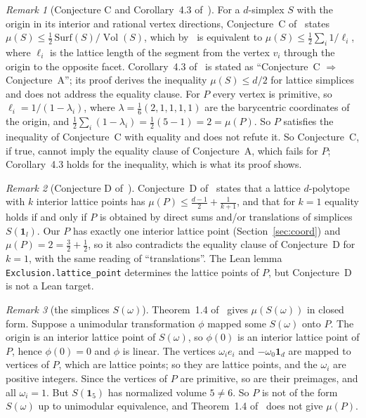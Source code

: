 \documentclass[11pt]{article}
\theoremstyle{definition}
\theoremstyle{remark}
\newtheorem{remark}{Remark}
\newcommand{\one}{\mathbf 1}
\newcommand{\Vol}{\operatorname{Vol}}
\begin{document}
\begin{remark}[Conjecture C and Corollary~4.3 of~\cite{css}]\label{rem:C}
For a $d$-simplex $S$ with the origin in its interior and rational vertex
directions, Conjecture~C of~\cite{css} states $\mu(S)\le\frac12\,\mathrm{Surf}(S)/\Vol(S)$,
which by~\cite[Lemma~4.1]{css} is equivalent to
$\mu(S)\le\frac12\sum_i1/\ell_i$, where $\ell_i$ is the lattice length of the
segment from the vertex $v_i$ through the origin to the opposite facet.
Corollary~4.3 of~\cite{css} is stated as ``Conjecture~C $\Rightarrow$
Conjecture~A''; its proof derives the inequality $\mu(S)\le d/2$ for lattice
simplices and does not address the equality clause. For $P$ every vertex is
primitive, so $\ell_i=1/(1-\lambda_i)$, where $\lambda=\frac16(2,1,1,1,1)$ are
the barycentric coordinates of the origin, and
$\frac12\sum_i(1-\lambda_i)=\frac12(5-1)=2=\mu(P)$. So $P$ satisfies the
inequality of Conjecture~C with equality and does not refute it. So Conjecture~C,
if true, cannot imply the equality clause of Conjecture~A, which fails for
$P$; Corollary~4.3 holds for the inequality, which is what its proof
shows.
\end{remark}

\begin{remark}[Conjecture D of~\cite{css}]\label{rem:D}
Conjecture~D of~\cite{css} states that a lattice $d$-polytope with $k$
interior lattice points has $\mu(P)\le\frac{d-1}2+\frac1{k+1}$, and that for
$k=1$ equality holds if and only if $P$ is obtained by direct sums and/or
translations of simplices $S(\one_l)$. Our $P$ has exactly one interior
lattice point (Section~\ref{sec:coord}) and $\mu(P)=2=\frac32+\frac12$, so it
also contradicts the equality clause of Conjecture~D for $k=1$, with the same
reading of ``translations''. The Lean lemma \texttt{Exclusion.lattice\_point}
determines the lattice points of $P$, but Conjecture~D is not a Lean target.
\end{remark}

\begin{remark}[the simplices $S(\omega)$]\label{rem:somega}
Theorem~1.4 of~\cite{css} gives $\mu(S(\omega))$ in closed form. Suppose a
unimodular transformation $\phi$ mapped some $S(\omega)$ onto $P$. The origin is
an interior lattice point of $S(\omega)$, so $\phi(0)$ is an interior lattice
point of $P$, hence $\phi(0)=0$ and $\phi$ is linear. The vertices
$\omega_ie_i$ and $-\omega_0\one_d$ are mapped to vertices of $P$, which are
lattice points; so they are lattice points, and the $\omega_i$ are positive
integers. Since the vertices of $P$ are primitive, so are their preimages, and
all $\omega_i=1$. But $S(\one_5)$ has normalized volume $5\ne6$. So $P$ is not
of the form $S(\omega)$ up to unimodular equivalence, and Theorem~1.4
of~\cite{css} does not give $\mu(P)$.
\end{remark}
\end{document}
